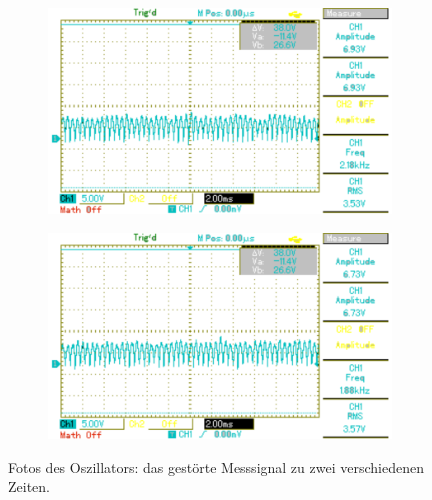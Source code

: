 \begin{figure}[h!]
	\centering
	\begin{subfigure}{0.49\textwidth}
		\includegraphics[width=\textwidth]{Bilder/MAP002.pdf}
	\end{subfigure}
	\begin{subfigure}{0.49\textwidth}
		\includegraphics[width=\textwidth]{Bilder/MAP003.pdf}
	\end{subfigure}
	\caption{Fotos des Oszillators: das gestörte Messsignal zu zwei verschiedenen Zeiten. \cite{gimp}}
	\label{fig:stoerung}
\end{figure}

